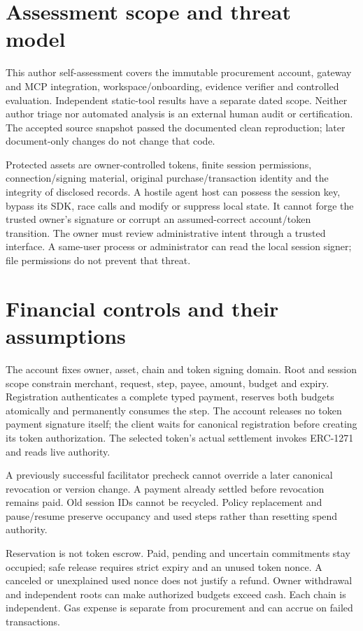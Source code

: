 \section{Assessment scope and threat model}
This author self-assessment covers the immutable procurement account, gateway and MCP integration, workspace/onboarding, evidence verifier and controlled evaluation. Independent static-tool results have a separate dated scope. Neither author triage nor automated analysis is an external human audit or certification. The accepted source snapshot passed the documented clean reproduction; later document-only changes do not change that code.\citep{implementation,repro}

Protected assets are owner-controlled tokens, finite session permissions, connection/signing material, original purchase/transaction identity and the integrity of disclosed records. A hostile agent host can possess the session key, bypass its SDK, race calls and modify or suppress local state. It cannot forge the trusted owner's signature or corrupt an assumed-correct account/token transition. The owner must review administrative intent through a trusted interface. A same-user process or administrator can read the local session signer; file permissions do not prevent that threat.


\section{Financial controls and their assumptions}
The account fixes owner, asset, chain and token signing domain. Root and session scope constrain merchant, request, step, payee, amount, budget and expiry. Registration authenticates a complete typed payment, reserves both budgets atomically and permanently consumes the step. The account releases no token payment signature itself; the client waits for canonical registration before creating its token authorization. The selected token's actual settlement invokes ERC-1271 and reads live authority.\citep{erc712,erc1271,erc3009,x402compat}

A previously successful facilitator precheck cannot override a later canonical revocation or version change. A payment already settled before revocation remains paid. Old session IDs cannot be recycled. Policy replacement and pause/resume preserve occupancy and used steps rather than resetting spend authority.

Reservation is not token escrow. Paid, pending and uncertain commitments stay occupied; safe release requires strict expiry and an unused token nonce. A canceled or unexplained used nonce does not justify a refund. Owner withdrawal and independent roots can make authorized budgets exceed cash. Each chain is independent. Gas expense is separate from procurement and can accrue on failed transactions.


